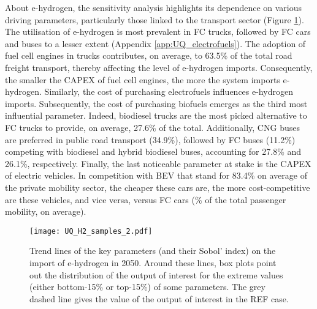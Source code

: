 About e-hydrogen, the sensitivity analysis highlights its dependence on various driving parameters, particularly those linked to the transport sector (Figure \ref{fig:results_uq_samples_H2}). The utilisation of e-hydrogen is most prevalent in \gls{FC} trucks, followed by \gls{FC} cars and buses to a lesser extent (Appendix \ref{app:UQ_electrofuels}). The adoption of fuel cell engines in trucks contributes, on average, to 63.5\% of the total road freight transport, thereby affecting the level of e-hydrogen imports. Consequently, the smaller the CAPEX of fuel cell engines, the more the system imports e-hydrogen. Similarly, the cost of purchasing electrofuels influences e-hydrogen imports. Subsequently, the cost of purchasing biofuels emerges as the third most influential parameter. Indeed, biodiesel trucks are the most picked alternative to \gls{FC} trucks to provide, on average, 27.6\% of the total. Additionally, \gls{CNG} buses are preferred in public road transport (34.9\%), followed by \gls{FC} buses (11.2\%) competing with biodiesel and hybrid biodiesel buses, accounting for 27.8\% and 26.1\%, respectively. Finally, the last noticeable parameter at stake is the CAPEX of electric vehicles. In competition with \gls{BEV} that stand for 83.4\% on average of the private mobility sector, the cheaper these cars are, the more cost-competitive are these vehicles, and vice versa, versus \gls{FC} cars (\% of the total passenger mobility, on average).

\begin{figure}[htbp!]
\centering
\texttt{[image: UQ\_H2\_samples\_2.pdf]}
\caption{Trend lines of the key parameters (and their Sobol' index) on the import of e-hydrogen in 2050. Around these lines, box plots point out the distribution of the output of interest for the extreme values (either bottom-15\% or top-15\%) of some parameters. The grey dashed line gives the value of the output of interest in the REF case. }
\label{fig:results_uq_samples_H2}
\end{figure}

